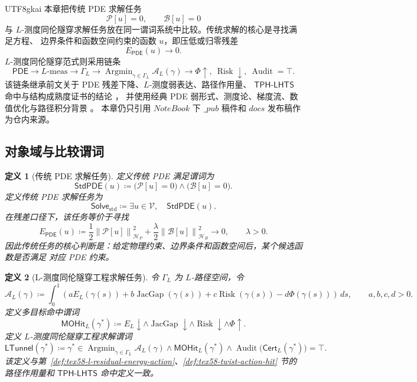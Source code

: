 \documentclass[12pt]{article}
\newtheorem{definition}{定义}[section]
\newcommand{\DefEq}{\coloneqq}
\newcommand{\Pcal}{\mathcal P}
\newcommand{\Bcal}{\mathcal B}
\newcommand{\Vcal}{\mathcal V}
\newcommand{\Hcal}{\mathcal H}
\newcommand{\TPHLHTS}{\ensuremath{\mathsf{TPH\mbox{-}LHTS}}}
\newcommand{\PDE}{\ensuremath{\mathsf{PDE}}}
\newcommand{\norm}[1]{\left\lVert #1 \right\rVert}
\DeclareMathOperator{\Audit}{Audit}
\DeclareMathOperator{\JacGap}{JacGap}
\DeclareMathOperator{\Risk}{Risk}
\newcommand{\Lmeas}{L\text{-}\mathrm{meas}}
\DeclareMathOperator*{\Argmin}{Argmin}
\begin{document}
\begin{CJK*}{UTF8}{gkai}
本章把传统 PDE 求解任务
\[
  \Pcal[u]=0,
  \qquad
  \Bcal[u]=0
\]
与 \(L\)-测度同伦隧穿求解任务放在同一谓词系统中比较。传统求解的核心是寻找满足方程、
边界条件和函数空间约束的函数 \(u\)，即压低或归零残差
\[
  E_{\PDE}(u)\to0.
\]
\(L\)-测度同伦隧穿范式则采用链条
\[
  \PDE
  \rightarrow
  \Lmeas
  \rightarrow
  \Gamma_L
  \rightarrow
  \Argmin_{\gamma\in\Gamma_L}\mathcal A_L(\gamma)
  \rightarrow
  \Phi\uparrow,\ \Risk\downarrow,\ \Audit=\top.
\]
该链条继承前文关于 PDE 残差下降、\(L\)-测度弱表达、路径作用量、
\TPHLHTS{} 命中与结构成熟度证书的结论
\cite{RepoTex55PDEParadigm,RepoTex56LHTS,RepoTex57TPHLHTS}，
并使用经典 PDE 弱形式、测度论、梯度流、数值优化与路径积分背景
\cite{Evans2010PDE,BrennerScott2008FEM,Bogachev2007MeasureTheory,
AmbrosioGigliSavare2008GradientFlows,NocedalWright2006NumericalOptimization,
FeynmanHibbs1965PathIntegrals,FreidlinWentzell2012RandomPerturbations}。
本章仍只引用 \(NoteBook\) 下 \(\_pub\) 稿件和 \(docs\) 发布稿作为仓内来源。

\subsection{对象域与比较谓词}
\label{subsec:tex58-strategic-objects}

\begin{definition}[传统 PDE 求解任务]
\label{def:tex58-traditional-pde-task}
定义传统 PDE 满足谓词为
\[
  \mathsf{StdPDE}(u)
  \DefEq
  \bigl(\Pcal[u]=0\bigr)\wedge\bigl(\Bcal[u]=0\bigr).
\]
定义传统 PDE 求解任务为
\[
  \mathsf{Solve}_{\mathrm{std}}
  \DefEq
  \exists u\in\Vcal,\quad \mathsf{StdPDE}(u).
\]
在残差口径下，该任务等价于寻找
\[
  E_{\PDE}(u)
  \DefEq
  \frac12\norm{\Pcal[u]}_{\Hcal_P}^{2}
  +
  \frac{\lambda}{2}\norm{\Bcal[u]}_{\Hcal_B}^{2}
  \to0,
  \qquad \lambda>0.
\]
因此传统任务的核心判断是：给定物理约束、边界条件和函数空间后，某个候选函数是否满足
对应 PDE 约束。
\end{definition}

\begin{definition}[L-测度同伦隧穿工程求解任务]
\label{def:tex58-lmeasure-tunnel-engineering-task}
令 \(\Gamma_L\) 为 \(L\)-路径空间，令
\[
  \mathcal A_L(\gamma)
  \DefEq
  \int_0^1
  \left(
  aE_L(\gamma(s))
  +
  b\JacGap(\gamma(s))
  +
  c\Risk(\gamma(s))
  -
  d\Phi(\gamma(s))
  \right)\,ds,
  \qquad a,b,c,d>0.
\]
定义多目标命中谓词
\[
  \mathsf{MOHit}_L(\gamma^\ast)
  \DefEq
  E_L\downarrow
  \wedge
  \JacGap\downarrow
  \wedge
  \Risk\downarrow
  \wedge
  \Phi\uparrow.
\]
定义 \(L\)-测度同伦隧穿工程求解谓词
\[
  \mathsf{LTunnel}(\gamma^\ast)
  \DefEq
  \gamma^\ast\in\Argmin_{\gamma\in\Gamma_L}\mathcal A_L(\gamma)
  \wedge
  \mathsf{MOHit}_L(\gamma^\ast)
  \wedge
  \Audit\bigl(\mathsf{Cert}_L(\gamma^\ast)\bigr)=\top.
\]
该定义与第~\ref{def:tex58-l-residual-energy-action}、\ref{def:tex58-twist-action-hit} 节的
路径作用量和 \TPHLHTS{} 命中定义一致。
\end{definition}


\end{CJK*}
\end{document}
